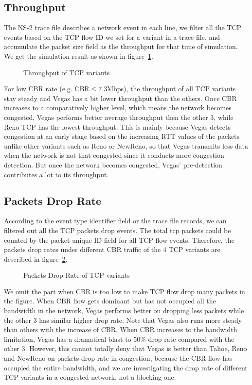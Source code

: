 \documentclass[10pt, conference]{lib/IEEEtran}
\begin{document}
\subsection{Throughput}
The NS-2 trace file describes a network event in each line, we filter all the TCP events based on the 
TCP flow ID we set for a variant in a trace file, and accumulate the packet size field as the throughput 
for that time of simulation.
We get the simulation result as shown in figure~\ref{fig:exp1_thp}.
\begin{figure}[!htb]
    \centering
    \resizebox{0.9\linewidth}{!}{}
    \caption{Throughput of TCP variants}
    \label{fig:exp1_thp}
\end{figure}
For low CBR rate (e.g. CBR$ \le 7.3$Mbps), the throughput of all TCP variants stay steady and Vegas has a 
bit lower throughput than the others. Once CBR increases to a comparatively higher level, which means 
the network becomes congested, Vegas performs better average throughput then the other 3, while Reno 
TCP has the lowest throughput. This is mainly because Vegas detects congestion at an early stage based 
on the increasing RTT values of the packets unlike other variants such as Reno or NewReno, so that Vegas 
transmits less data when the network is not that congested since it conducts more congestion detection. 
But once the network becomes congested, Vegas' pre-detection contributes a lot to its throughput.

\subsection{Packets Drop Rate}
According to the event type identifier field or the trace file records, we can filtered out all the TCP 
packets drop events. The total tcp packets could be counted by the packet unique ID field for all TCP 
flow events. Therefore, the packets drop rates under different CBR traffic of the 4 TCP variants are 
described in figure~\ref{fig:exp1_dr}.
\begin{figure}[!htb]
    \centering
    \resizebox{0.9\linewidth}{!}{}
    \caption{Packets Drop Rate of TCP variants}
    \label{fig:exp1_dr}
\end{figure}
We omit the part when CBR is too low to make TCP flow drop many packets in the figure. When CBR flow gets 
dominant but has not occupied all the bandwidth in the network, Vegas performs better on dropping less 
packets while the other 3 has similar higher drop rate. Note that Vegas also runs more steady than others 
with the increase of CBR. When CBR increases to the bandwidth limitation, Vegas has a dramatical blast to 
$50\%$ drop rate compared with the other 3. However, this cannot totally deny that Vegas is better than 
Tahoe, Reno and NewReno on packets drop rate in congestion, because the CBR flow has occupied the entire 
bandwidth, and we are investigating the drop rate of different TCP variants in a congested network, not a 
blocking one.
\end{document}
